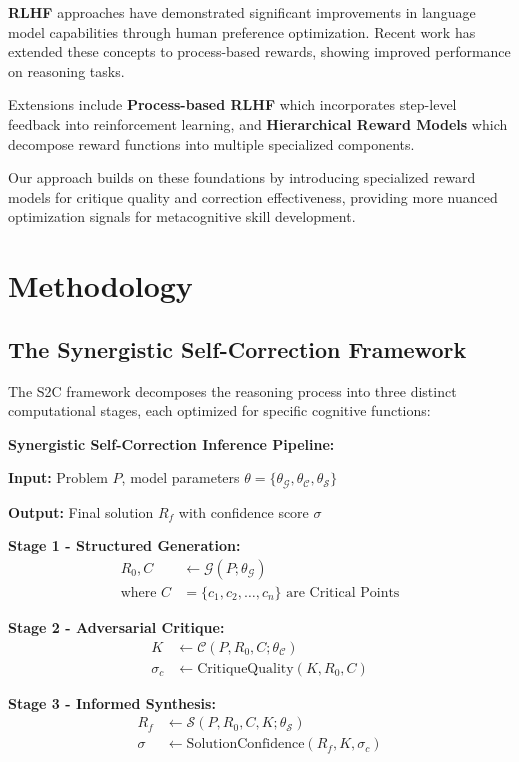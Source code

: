 \documentclass[10pt,twocolumn]{article}
\newcommand{\ssc}{\textsc{S2C}}
\newcommand{\Generator}{\mathcal{G}}
\newcommand{\Critic}{\mathcal{C}}
\newcommand{\Synthesizer}{\mathcal{S}}
\begin{document}
\textbf{RLHF} approaches have demonstrated significant improvements in language model capabilities through human preference optimization. Recent work has extended these concepts to process-based rewards, showing improved performance on reasoning tasks.

Extensions include \textbf{Process-based RLHF} which incorporates step-level feedback into reinforcement learning, and \textbf{Hierarchical Reward Models} which decompose reward functions into multiple specialized components.

Our approach builds on these foundations by introducing specialized reward models for critique quality and correction effectiveness, providing more nuanced optimization signals for metacognitive skill development.

\section{Methodology}

\subsection{The Synergistic Self-Correction Framework}

The \ssc{} framework decomposes the reasoning process into three distinct computational stages, each optimized for specific cognitive functions:

\textbf{Synergistic Self-Correction Inference Pipeline:}

\noindent\textbf{Input:} Problem $P$, model parameters $\theta = \{\theta_\Generator, \theta_\Critic, \theta_\Synthesizer\}$

\noindent\textbf{Output:} Final solution $R_f$ with confidence score $\sigma$

\noindent\textbf{Stage 1 - Structured Generation:}
\begin{align}
R_0, C &\leftarrow \Generator(P; \theta_\Generator) \\
\text{where } C &= \{c_1, c_2, \ldots, c_n\} \text{ are Critical Points}
\end{align}

\noindent\textbf{Stage 2 - Adversarial Critique:}
\begin{align}
K &\leftarrow \Critic(P, R_0, C; \theta_\Critic) \\
\sigma_c &\leftarrow \text{CritiqueQuality}(K, R_0, C)
\end{align}

\noindent\textbf{Stage 3 - Informed Synthesis:}
\begin{align}
R_f &\leftarrow \Synthesizer(P, R_0, C, K; \theta_\Synthesizer) \\
\sigma &\leftarrow \text{SolutionConfidence}(R_f, K, \sigma_c)
\end{align}
\end{document}
